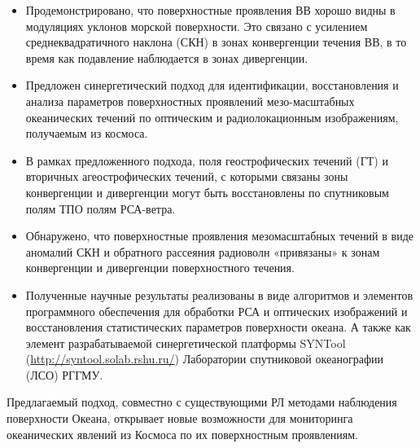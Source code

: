 \begin{itemize}
\item Продемонстрировано, что поверхностные проявления ВВ хорошо видны в модуляциях уклонов морской поверхности. Это связано с усилением среднеквадратичного наклона (СКН) в зонах конвергенции течения ВВ, в то время как подавление наблюдается в зонах дивергенции.

\item Предложен синергетический подход для идентификации, восстановления и анализа параметров поверхностных проявлений мезо-масштабных океанических течений по оптическим и радиолокационным изображениям, получаемым из космоса.

\item В рамках предложенного подхода, поля геострофических течений (ГТ) и вторичных агеострофических течений, с которыми связаны зоны конвергенции и дивергенции могут быть восстановлены по спутниковым полям ТПО полям РСА-ветра. 

\item Обнаружено, что поверхностные проявления мезомасштабных течений в виде аномалий СКН и обратного рассеяния радиоволн «привязаны» к зонам конвергенции и дивергенции поверхностного течения.

\item Полученные научные результаты реализованы в виде алгоритмов и элементов программного обеспечения для обработки РСА и оптических изображений и восстановления статистических параметров поверхности океана. А также как элемент разрабатываемой синергетической платформы SYNTool (\url{http://syntool.solab.rshu.ru/}) Лаборатории спутниковой океанографии (ЛСО) РГГМУ.

\end{itemize}

Предлагаемый подход, совместно с существующими РЛ методами наблюдения поверхности Океана, открывает новые возможности для мониторинга океанических явлений из Космоса по их поверхностным проявлениям.

\clearpage